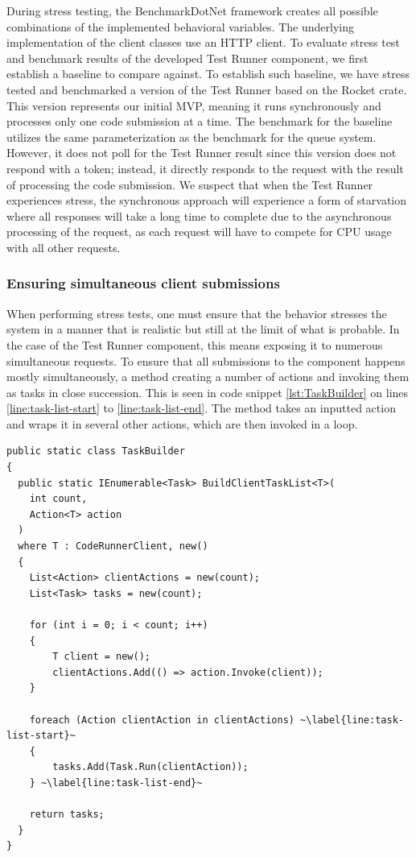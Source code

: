 During stress testing, the BenchmarkDotNet framework creates all possible combinations of the implemented behavioral variables.
The underlying implementation of the client classes use an HTTP client.
To evaluate stress test and benchmark results of the developed Test Runner component, we first establish a baseline to compare against.
To establish such baseline, we have stress tested and benchmarked a version of the Test Runner based on the Rocket crate.
This version represents our initial MVP, meaning it runs synchronously and processes only one code submission at a time.
The benchmark for the baseline utilizes the same parameterization as the benchmark for the queue system.
However, it does not poll for the Test Runner result since this version does not respond with a token; instead, it directly responds to the request with the result of processing the code submission.
We suspect that when the Test Runner experiences stress, the synchronous approach will experience a form of starvation where all responses will take a long time to complete due to the asynchronous processing of the request, as each request will have to compete for CPU usage with all other requests.

\subsubsection{Ensuring simultaneous client submissions}
When performing stress tests, one must ensure that the behavior stresses the system in a manner that is realistic but still at the limit of what is probable.
In the case of the Test Runner component, this means exposing it to numerous simultaneous requests.
To ensure that all submissions to the component happens mostly simultaneously, a method creating a number of actions and invoking them as tasks in close succession. This is seen in code snippet \ref{lst:TaskBuilder} on lines \ref{line:task-list-start} to \ref{line:task-list-end}.
The method takes an inputted action and wraps it in several other actions, which are then invoked in a loop.

\begin{lstlisting}[language=CSharp, escapechar=~, caption={C\# code showing the \texttt{BuildClientTaskList} method, which is used to build a number of actions which are executed simultaneously in a Task}, label={lst:TaskBuilder}]
public static class TaskBuilder
{
  public static IEnumerable<Task> BuildClientTaskList<T>(
    int count,
    Action<T> action
  )
  where T : CodeRunnerClient, new()
  {
    List<Action> clientActions = new(count);
    List<Task> tasks = new(count);

    for (int i = 0; i < count; i++)
    {
        T client = new();
        clientActions.Add(() => action.Invoke(client));
    }

    foreach (Action clientAction in clientActions) ~\label{line:task-list-start}~
    {
        tasks.Add(Task.Run(clientAction)); 
    } ~\label{line:task-list-end}~

    return tasks;
  }
}
\end{lstlisting}

